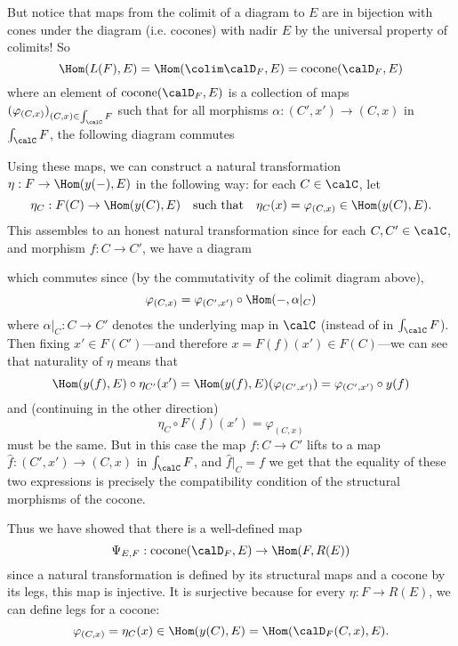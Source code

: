 \documentclass[12pt]{article}
\begin{document}
\begin{prf}
	But notice that maps from the colimit of a diagram to $E$ are in bijection with cones under the diagram (i.e. cocones)
	with nadir $E$ by the universal property of colimits! So 
	\[\Hom(L(F),E)=\Hom(\colim\calD_F,E)=\operatorname{cocone}(\calD_F,E)\]
	where an element of $\operatorname{cocone}(\calD_F,E)$ is a collection of maps $(\varphi_{(C,x)})_{(C,x)\in\int_\calC F}$
	such that for all morphisms $\alpha:(C',x')\to (C,x)$ in $\int_\calC F$, the following diagram commutes 
	\begin{center}
	\end{center}
	Using these maps, we can construct a natural transformation $\eta:F\to \Hom(y(-),E)$
	in the following way: for each $C\in\calC$, let 
	\[\eta_C:F(C)\to \Hom(y(C),E)\quad\text{such that}\quad \eta_C(x)=\varphi_{(C,x)}\in\Hom(y(C),E).\]
	This assembles to an honest natural transformation since for each $C,C'\in\calC$, and morphism $f:C\to C'$, we have a diagram
	\begin{center}
	\end{center}
	which commutes since (by the commutativity of the colimit diagram above),
	\[\varphi_{(C,x)}=\varphi_{(C',x')}\circ\Hom(-,\alpha|_C)\]
	where $\alpha|_C:C\to C'$ denotes the underlying map in $\calC$ (instead of in $\int_\calC F$). Then fixing
	$x'\in F(C')$---and therefore $x=F(f)(x')\in F(C)$---we can see that naturality of $\eta$ means that 
	\[\Hom(y(f),E)\circ\eta_{C'}(x')=\Hom(y(f),E)(\varphi_{(C',x')})=\varphi_{(C',x')}\circ y(f)\]
	and (continuing in the other direction)
	\[\eta_C\circ F(f)(x')=\varphi_{(C,x)}\]
	must be the same. But in this case the map $f:C\to C'$ lifts to a map $\hat f:(C',x')\to (C,x)$ in $\int_\calC F$,
	and $\hat f|_{C}=f$ we get that the equality of these two expressions is precisely the compatibility condition of the 
	structural morphisms of the cocone.

	Thus we have showed that there is a well-defined map
	\[\Psi_{E,F}:\operatorname{cocone}(\calD_F,E)\to\Hom(F,R(E))\]
	since a natural transformation is defined by its structural maps and a cocone by its legs, this map is injective.
	It is surjective because for every $\eta:F\to R(E)$, we can define legs for a cocone:
	\[\varphi_{(C,x)}=\eta_C(x)\in\Hom(y(C),E)=\Hom(\calD_F(C,x),E).\]
	

\end{prf}
\end{document}
